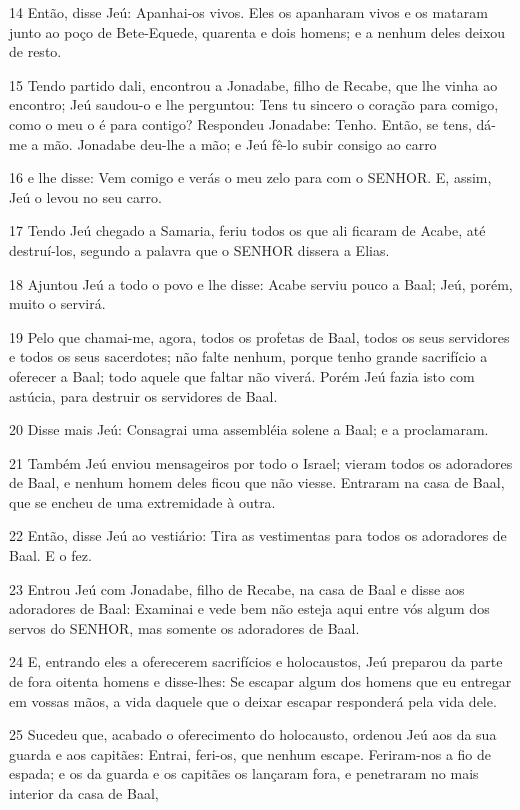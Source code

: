 \par 14 Então, disse Jeú: Apanhai-os vivos. Eles os apanharam vivos e os mataram junto ao poço de Bete-Equede, quarenta e dois homens; e a nenhum deles deixou de resto.
\par 15 Tendo partido dali, encontrou a Jonadabe, filho de Recabe, que lhe vinha ao encontro; Jeú saudou-o e lhe perguntou: Tens tu sincero o coração para comigo, como o meu o é para contigo? Respondeu Jonadabe: Tenho. Então, se tens, dá-me a mão. Jonadabe deu-lhe a mão; e Jeú fê-lo subir consigo ao carro
\par 16 e lhe disse: Vem comigo e verás o meu zelo para com o SENHOR. E, assim, Jeú o levou no seu carro.
\par 17 Tendo Jeú chegado a Samaria, feriu todos os que ali ficaram de Acabe, até destruí-los, segundo a palavra que o SENHOR dissera a Elias.
\par 18 Ajuntou Jeú a todo o povo e lhe disse: Acabe serviu pouco a Baal; Jeú, porém, muito o servirá.
\par 19 Pelo que chamai-me, agora, todos os profetas de Baal, todos os seus servidores e todos os seus sacerdotes; não falte nenhum, porque tenho grande sacrifício a oferecer a Baal; todo aquele que faltar não viverá. Porém Jeú fazia isto com astúcia, para destruir os servidores de Baal.
\par 20 Disse mais Jeú: Consagrai uma assembléia solene a Baal; e a proclamaram.
\par 21 Também Jeú enviou mensageiros por todo o Israel; vieram todos os adoradores de Baal, e nenhum homem deles ficou que não viesse. Entraram na casa de Baal, que se encheu de uma extremidade à outra.
\par 22 Então, disse Jeú ao vestiário: Tira as vestimentas para todos os adoradores de Baal. E o fez.
\par 23 Entrou Jeú com Jonadabe, filho de Recabe, na casa de Baal e disse aos adoradores de Baal: Examinai e vede bem não esteja aqui entre vós algum dos servos do SENHOR, mas somente os adoradores de Baal.
\par 24 E, entrando eles a oferecerem sacrifícios e holocaustos, Jeú preparou da parte de fora oitenta homens e disse-lhes: Se escapar algum dos homens que eu entregar em vossas mãos, a vida daquele que o deixar escapar responderá pela vida dele.
\par 25 Sucedeu que, acabado o oferecimento do holocausto, ordenou Jeú aos da sua guarda e aos capitães: Entrai, feri-os, que nenhum escape. Feriram-nos a fio de espada; e os da guarda e os capitães os lançaram fora, e penetraram no mais interior da casa de Baal,
